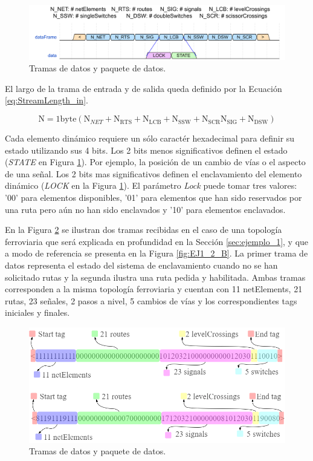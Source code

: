 	\begin{figure}[H]
		\centering
		\includegraphics[width=1\textwidth]{Figuras/Tramas.png}
		\centering\caption{Tramas de datos y paquete de datos.}
		\label{fig:Stream}
	\end{figure}
	
	El largo de la trama de entrada y de salida queda definido por la Ecuación \ref{eq:StreamLength_in}. 
	
	\begin{equation} 
		\label{eq:StreamLength_in}
		\text{N} = 1\text{byte} (\text{N}_{NET}+\text{N}_{\text{RTS}}+\text{N}_{\text{LCB}}+\text{N}_{\text{SSW}}+\text{N}_{\text{SCR}}\text{N}_{\text{SIG}}+\text{N}_{\text{DSW}})
	\end{equation}
	
	Cada elemento dinámico requiere un sólo caractér hexadecimal para definir su estado utilizando sus 4 bits. Los 2 bits menos significativos definen el estado (\textit{STATE} en Figura \ref{fig:Stream}). Por ejemplo, la posición de un cambio de vías o el aspecto de una señal. Los 2 bits mas significativos definen el enclavamiento del elemento dinámico (\textit{LOCK} en la Figura \ref{fig:Stream}). El parámetro \textit{Lock} puede tomar tres valores: '00' para elementos disponibles, '01' para elementos que han sido reservados por una ruta pero aún no han sido enclavados y '10' para elementos enclavados.
	
	En la Figura \ref{fig:Stream_ejemplo1} se ilustran dos tramas recibidas en el caso de una topología ferroviaria que será explicada en profundidad en la Sección \ref{sec:ejemplo_1}, y que a modo de referencia se presenta en la Figura \ref{fig:EJ1_2_B}. La primer trama de datos representa el estado del sistema de enclavamiento cuando no se han solicitado rutas y la segunda ilustra una ruta pedida y habilitada. Ambas tramas corresponden a la misma topología ferroviaria y cuentan con 11 netElements, 21 rutas, 23 señales, 2 pasos a nivel, 5 cambios de vías y los correspondientes tags iniciales y finales.
	
	\begin{figure}[H]
		\centering
		\includegraphics[width=1\textwidth]{Figuras/Trama_ejemplo.png}
		\centering\caption{Tramas de datos y paquete de datos.}
		\label{fig:Stream_ejemplo1}
	\end{figure}
	
